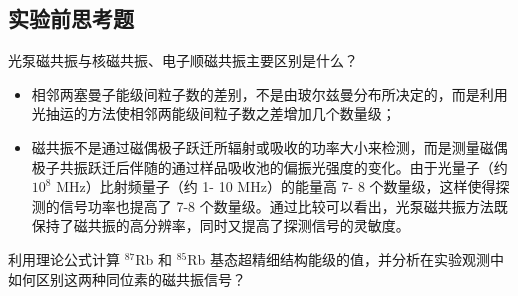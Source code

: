 \subsection{实验前思考题}


\begin{question}
光泵磁共振与核磁共振、电子顺磁共振主要区别是什么？
\end{question}

\begin{itemize}
    \item 相邻两塞曼子能级间粒子数的差别，不是由玻尔兹曼分布所决定的，而是利用光抽运的方法使相邻两能级间粒子数之差增加几个数量级；
    \item 磁共振不是通过磁偶极子跃迁所辐射或吸收的功率大小来检测，而是测量磁偶极子共振跃迁后伴随的通过样品吸收池的偏振光强度的变化。由于光量子（约 $10^8$ MHz）比射频量子（约 1- 10 MHz）的能量高 7- 8 个数量级，这样使得探测的信号功率也提高了 7-8 个数量级。通过比较可以看出，光泵磁共振方法既保持了磁共振的高分辨率，同时又提高了探测信号的灵敏度。
\end{itemize}

\begin{question}
利用理论公式计算 $^{87}$Rb 和 $^{85}$Rb 基态超精细结构能级的值，并分析在实验观测中如何区别这两种同位素的磁共振信号？
\end{question}


